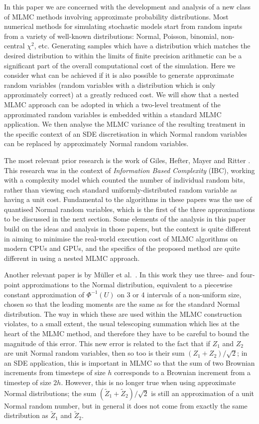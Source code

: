\documentclass[11pt]{article}
\def \tZ {{\widetilde{Z}}}
\begin{document}
In this paper we are concerned with the development and analysis of a new
class of MLMC methods involving approximate probability distributions.
Most numerical methods for simulating stochastic models start from random
inputs from a variety of well-known distributions: Normal, Poisson, binomial,
non-central $\chi^2$, etc.  Generating samples which have a distribution
which matches the desired distribution to within the limits of finite precision
arithmetic can be a significant part of the overall computational cost of
the simulation.
Here we consider what can be achieved if it is also possible to generate
approximate random variables (random variables with a distribution
which is only approximately correct) at a greatly reduced cost.
We will show that a nested MLMC approach can be adopted in which a two-level
treatment of the approximated random variables is embedded within a standard
MLMC application. We then analyse the MLMC variance of the resulting treatment
in the specific context of an SDE discretisation in which Normal random variables
can be replaced by approximately Normal random variables.

The most relevant prior research is the work of Giles, Hefter, Mayer and Ritter
\cite{ghmr19,ghmr19b}.  
This research was in the context of \emph{Information Based Complexity} (IBC), 
working with a complexity model which counted the number of
individual random bits, rather than viewing each standard
uniformly-distributed random
variable as having a unit cost.  Fundamental to the algorithms in these papers
was the use of quantised Normal random variables, which is the first of the
three approximations to be discussed in the next section.  Some elements of the
analysis in this paper build on the ideas and analysis in those papers, but
the context is quite different in aiming to minimise the real-world execution
cost of MLMC algorithms on modern CPUs and GPUs, and the specifics of the
proposed method are quite different in using a nested MLMC approach.

Another relevant paper is by M\"uller et al.~\cite{mss15}.
In this work they use three- and four-point approximations to the Normal
distribution, equivalent to a piecewise constant approximation of $\Phi^{-1}(U)$
on 3 or 4 intervals of a non-uniform size, chosen so that the leading moments
are the same as for the standard Normal distribution.  The way in which these
are used within the MLMC construction violates, to a small extent, the usual
telescoping summation which lies at the heart of the MLMC method, and therefore
they have to be careful to bound the magnitude of this error. This new error is
related to the fact that if $Z_1$ and $Z_2$ are unit Normal random variables,
then so too is their sum $(Z_1{+}Z_2)/\sqrt{2}$; in an SDE application, this
is important in MLMC so that the sum of two Brownian increments from timesteps
of size $h$ corresponds to a Brownian increment from a timestep of size $2h$.
However, this is no longer true when using approximate Normal distributions;
the sum $(\tZ_1{+}\tZ_2)/\sqrt{2}$ is still an approximation of a unit Normal
random number, but in general it does not come from exactly the same distribution
as $\tZ_1$ and $\tZ_2$.
\end{document}
